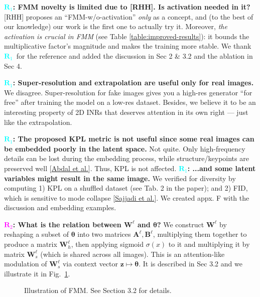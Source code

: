 \documentclass[rebuttal]{cvpr}
\newcommand{\ReviewerA}{\textcolor{cyan}{$\bm R_1$}}
\newcommand{\ReviewerB}{\textcolor{magenta}{$\bm R_2$}}
\newcommand{\ReviewerAsays}[1]{\textbf{\ReviewerA: \textbf{#1}}}
\newcommand{\ReviewerBsays}[1]{\textbf{\ReviewerB: \textbf{#1}}}
\begin{document}
\ReviewerAsays{FMM novelty is limited due to [RHH]. Is activation needed in it?}
[RHH] proposes an ``FMM-w/o-activation'' \textit{only} as a concept, and (to the best of our knowledge) our work is the first one to actually try it.
Moreover, \textit{the activation is crucial in FMM} (see Table \ref{table:improved-results}): it bounds the multiplicative factor's magnitude and makes the training more stable.
We thank \ReviewerA\ for the reference and added the discussion in Sec 2 \& 3.2 and the ablation in Sec 4.

\ReviewerAsays{Super-resolution and extrapolation are useful only for real images.}
We disagree. Super-resolution for fake images gives you a high-res generator ``for free'' after training the model on a low-res dataset.
Besides, we believe it to be an interesting property of 2D INRs that deserves attention in its own right --- just like the extrapolation.

\ReviewerAsays{The proposed KPL metric is not useful since some real images can be embedded poorly in the latent space.}
Not quite. Only high-frequency details can be lost during the embedding process, while structure/keypoints are preserved well [\href{https://openaccess.thecvf.com/content_ICCV_2019/html/Abdal_Image2StyleGAN_How_to_Embed_Images_Into_the_StyleGAN_Latent_Space_ICCV_2019_paper}{Abdal et al.}].
Thus, KPL is not affected.
\ReviewerAsays{...and some latent variables might result in the same image.}
We verified for diversity by computing 1) KPL on a shuffled dataset (see Tab. 2 in the paper); and 2) FID, which is sensitive to mode collapse [\href{https://papers.nips.cc/paper/2018/hash/f7696a9b362ac5a51c3dc8f098b73923-Abstract.html}{Sajjadi et al.}].
We created appx. F with the discussion and embedding examples.


\ReviewerBsays{What is the relation between $\bm{W}^{\ell}$ and $\bm{\theta}$?}
We construct $\bm{W}^\ell$ by reshaping a subset of $\bm\theta$ into two matrices $\bm{A}^\ell, \bm{B}^\ell$, multiplying them together to produce a matrix $\bm W^\ell_h$, then applying sigmoid $\sigma(x)$ to it and multiplying it by matrix $\bm W^\ell_s$ (which is shared across all images).
This is an attention-like modulation of $\bm W_s^\ell$ via context vector $\bm{z} \mapsto \bm{\theta}$.
It is described in Sec 3.2 and we illustrate it in Fig.~\ref{rebuttal:fig:fmm}.

\begin{figure}[t]
\centering
\caption{Illustration of FMM. See Section 3.2 for details.}
\label{rebuttal:fig:fmm}
\vspace{-0.4em}
\end{figure}
\end{document}
